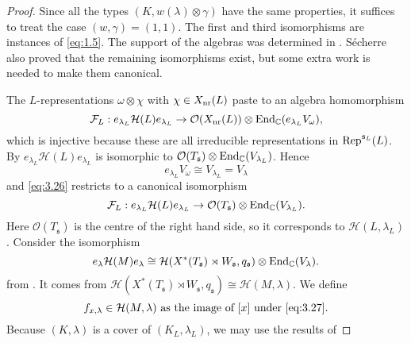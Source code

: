 \documentclass[11pt]{amsart}
\theoremstyle{definition}
\begin{document}
\begin{proof}
Since all the types $(K,w(\lambda) \otimes \gamma)$ have the same properties, 
it suffices to treat the case $(w,\gamma) = (1,1)$. The first and third isomorphisms 
are instances of \eqref{eq:1.5}. The support of the algebras was determined in
\cite[\S 4]{Sec3}. S\'echerre also proved that the remaining 
isomorphisms exist, but some extra work is needed to make them canonical.

The $L$-representations $\omega \otimes \chi$ with $\chi \in X_{{\rm nr}} (L)$ paste to an
algebra homomorphism \label{i:14}
\begin{equation}\label{eq:3.26}
\mathcal F_L : e_{\lambda_L} {{\mathcal H}} (L) e_{\lambda_L} \to \mathcal O (X_{{\rm nr}} (L))
\otimes {{\rm End}}_{\mathbb C} (e_{\lambda_L} V_\omega) ,
\end{equation}
which is injective because these are all irreducible representations in ${{\rm Rep}}^{{{\mathfrak s}}_L}(L)$.
By \cite[Th\'eor\`eme 4.6]{Sec3} $e_{\lambda_L} {{\mathcal H}} (L) e_{\lambda_L}$ is isomorphic to 
$\mathcal O (T_{{\mathfrak s}}) \otimes {{\rm End}}_{\mathbb C} (V_{\lambda_L})$. Hence 
\begin{equation}\label{eq:3.28}
e_{\lambda_L} V_\omega \cong V_{\lambda_L} = V_\lambda
\end{equation} 
and \eqref{eq:3.26} restricts to a canonical isomorphism
\begin{equation}\label{eq:3.15}
\mathcal F_L : e_{\lambda_L} {{\mathcal H}} (L) e_{\lambda_L} \to 
\mathcal O (T_{{\mathfrak s}}) \otimes {{\rm End}}_{\mathbb C} (V_{\lambda_L}) .
\end{equation}
Here $\mathcal O (T_{{\mathfrak s}})$ is the centre of the right hand side, so it corresponds to 
${{\mathcal H}} (L,\lambda_L)$. Consider the isomorphism
\begin{equation}\label{eq:3.27}
e_{\lambda} {{\mathcal H}} (M) e_{\lambda} \cong {{\mathcal H}} (X^* (T_{{\mathfrak s}}) \rtimes W_{{\mathfrak s}},q_{{\mathfrak s}})
\otimes {{\rm End}}_{\mathbb C} (V_{\lambda}) .
\end{equation}
from \cite[Th\'eor\`eme 4.6]{Sec3}. It comes from ${{\mathcal H}} (X^* (T_{{\mathfrak s}}) \rtimes W_{{\mathfrak s}},q_{{\mathfrak s}})
\cong {{\mathcal H}} (M,\lambda)$. We define \label{i:15}
\begin{equation}\label{eq:4.76}
f_{x,\lambda} \in {{\mathcal H}} (M,\lambda) 
\text{ as the image of } [x] \text{ under \eqref{eq:3.27}.}
\end{equation}
Because $(K,\lambda)$ is a cover of $(K_L,\lambda_L)$, we may use the results of 

\end{proof}
\end{document}
